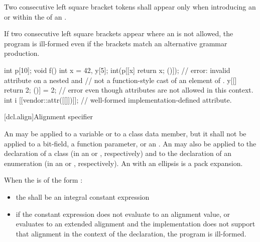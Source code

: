 \pnum
Two consecutive left square bracket tokens shall appear only
when introducing an  or
within the  of
an .
\begin{note} If two consecutive left square brackets appear
where an  is not allowed, the program is ill-formed even
if the brackets match an alternative grammar production. \end{note} \begin{example}
\begin{codeblock}
int p[10];
void f() {
  int x = 42, y[5];
  int(p[[x] { return x; }()]);  // error: invalid attribute on a nested  and
                                // not a function-style cast of an element of .
  y[[] { return 2; }()] = 2;    // error even though attributes are not allowed in this context.
  int i [[vendor::attr([[]])]]; // well-formed implementation-defined attribute.
}
\end{codeblock}
\end{example}

[dcl.align]{Alignment specifier}%

\pnum
An 
may be applied to a variable
or to a class data member, but it shall not be applied to a bit-field, a function
parameter, or an .
An  may also be applied to the declaration
of a class (in an
 or
, respectively) and to the
declaration of an enumeration (in an
 or ,
respectively).
An  with an ellipsis is a pack expansion.

\pnum
When the  is of the form
  \tcode{)}:

\begin{itemize}
\item the  shall be an integral constant expression

\item if the constant expression does not evaluate to an alignment
value, or evaluates to an extended alignment and
the implementation does not support that alignment in the context of the
declaration, the program is ill-formed.
\end{itemize}

